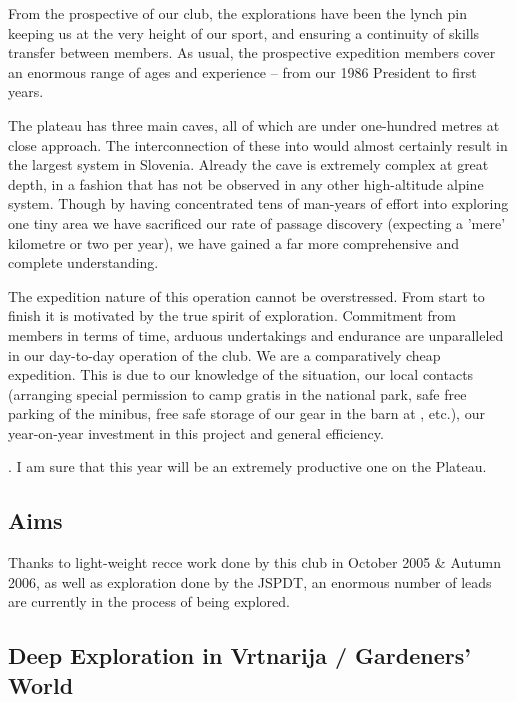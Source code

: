 From the prospective of our club, the  explorations have been the lynch pin keeping us at the very height of our sport, and ensuring a continuity of skills transfer between members. As usual, the prospective expedition members cover an enormous range of ages and experience -- from our 1986 President to first years.

The  plateau has three main caves, all of which are under one-hundred metres at close approach. The interconnection of these into  would almost certainly result in the largest system in Slovenia. Already the cave is extremely complex at great depth, in a fashion that has not be observed in any other high-altitude alpine system. Though by having concentrated tens of man-years of effort into exploring one tiny area we have sacrificed our rate of passage discovery (expecting a 'mere' kilometre or two per year), we have gained a far more comprehensive and complete understanding.

The expedition nature of this operation cannot be overstressed. From start to finish it is motivated by the true spirit of exploration. Commitment from members in terms of time, arduous undertakings and endurance are unparalleled in our day-to-day operation of the club. We are a comparatively cheap expedition. This is due to our knowledge of the situation, our local contacts (arranging special permission to camp gratis in the national park, safe free parking of the minibus, free safe storage of our gear in the barn at , etc.), our year-on-year investment in this project and general efficiency.

. I am sure that this year will be an extremely productive one on the  Plateau.


\subsection{Aims}

Thanks to light-weight recce work done by this club in October 2005 \& Autumn 2006, as well as exploration done by the JSPDT, an enormous number of leads are currently in the process of being explored.


\subsection{Deep Exploration in Vrtnarija / Gardeners' World}

